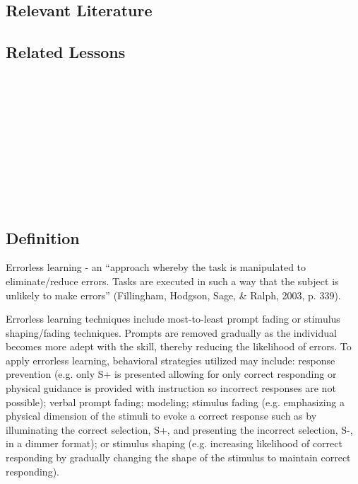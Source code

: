 \subsection{Relevant Literature}
\begin{refsection}
\nocite{etzel1979simplest,
    fisher2014handbook,
    walker2008constant}
\printbibliography[heading=none]
\end{refsection}
%
\subsection{Related Lessons}
\fourdFour{}\\
\fourdFive{}\\
\fourdSix{}\\
\fourdSeven{}\\
\fourdEight{}\\
\foureOne{}\\
\foureTwo{}\\
\foureThirteen{}\\
\fourFKTwentyFour{}\\
%
\clearpage \section{\foureTwelve{}}
\subsection{Definition}
Errorless learning - an ``approach whereby the task is manipulated to eliminate/reduce errors. Tasks are executed in such a way that the subject is unlikely to make errors'' (Fillingham, Hodgson, Sage, \& Ralph, 2003, p. 339). 

Errorless learning techniques include most-to-least prompt fading or stimulus shaping/fading techniques. Prompts are removed gradually as the individual becomes more adept with the skill, thereby reducing the likelihood of errors.  To apply errorless learning, behavioral strategies utilized may include: response prevention (e.g. only S+ is presented allowing for only correct responding or physical guidance is provided with instruction so incorrect responses are not possible); verbal prompt fading; modeling; stimulus fading (e.g. emphasizing a physical dimension of the stimuli to evoke a correct response such as by illuminating the correct selection, S+, and presenting the incorrect selection, S-, in a dimmer format); or stimulus shaping (e.g. increasing likelihood of correct responding by gradually changing the shape of the stimulus to maintain correct responding). 

